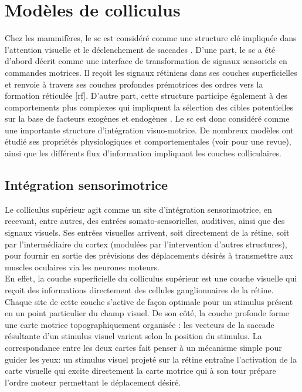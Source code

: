 \section{Modèles de colliculus}

Chez les mammifères, le \gls{sc} est considéré comme une structure clé impliquée dans l'attention visuelle et le déclenchement de saccades \cite{Isa:2002}. D'une part, le \gls{sc} a été d'abord décrit comme une interface de transformation de signaux sensoriels en commandes motrices. Il reçoit les signaux rétiniens dans ses couches superficielles et renvoie à travers ses couches profondes prémotrices des ordres vers la formation réticulée [\gls{rf}]. D'autre part, cette structure participe également à des comportements plus complexes qui impliquent la sélection des cibles potentielles sur la base de facteurs exogènes et endogènes \cite {Kramer:1999}. Le \gls{sc} est donc considéré comme une importante structure d'intégration visuo-motrice. De nombreux modèles ont étudié ses propriétés physiologiques et comportementales (voir \cite {Girard:2005} pour une revue), ainsi que les différents flux d'information impliquant les couches colliculaires.  \\

\subsection{Intégration sensorimotrice}

Le colliculus supérieur agit comme un site d'intégration sensorimotrice, en recevant, entre autres, des entrées somato-sensorielles, auditives, ainsi que des signaux visuels\cite{Nolte:1993}. Ses entrées visuelles arrivent, soit directement de la rétine, soit par l'intermédiaire du cortex (modulées par l'intervention d'autres structures), pour fournir en sortie des prévisions des déplacements désirés à transmettre aux muscles oculaires via les neurones moteurs\cite{Wurtz:1996,Nolte:1993,Ursino:2009}. \\

En effet, la couche superficielle du colliculus supérieur est une couche visuelle qui reçoit des informations directement des cellules ganglionnaires de la rétine. Chaque site de cette couche s'active de façon optimale pour un stimulus présent en un point particulier du champ visuel. De son côté, la couche profonde forme une carte motrice topographiquement organisée : les vecteurs de la saccade résultante d'un stimulus visuel varient selon la position du stimulus. La correspondance entre les deux cartes fait penser à un mécanisme simple pour guider les yeux: un stimulus visuel projeté sur la rétine entraîne l'activation de la carte visuelle qui excite directement la carte motrice qui à son tour prépare l'ordre moteur permettant le déplacement désiré.\\

